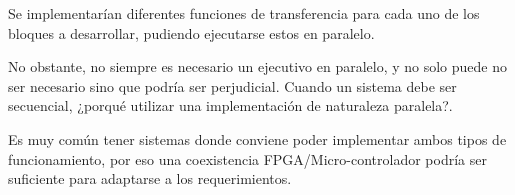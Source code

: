 \begin{center}
\end{center}

\begin{center}
\end{center}



Se implementarían diferentes funciones de transferencia para cada uno de los bloques a desarrollar, pudiendo ejecutarse estos en paralelo. \newline

No obstante, no siempre es necesario un ejecutivo en paralelo, y no solo puede no ser necesario sino que podría ser perjudicial. Cuando un sistema debe ser secuencial, ¿porqué utilizar una implementación de naturaleza paralela?. \newline

Es muy común tener sistemas donde conviene poder implementar ambos tipos de funcionamiento, por eso una coexistencia FPGA/Micro-controlador podría ser suficiente para adaptarse a los requerimientos. \newline

